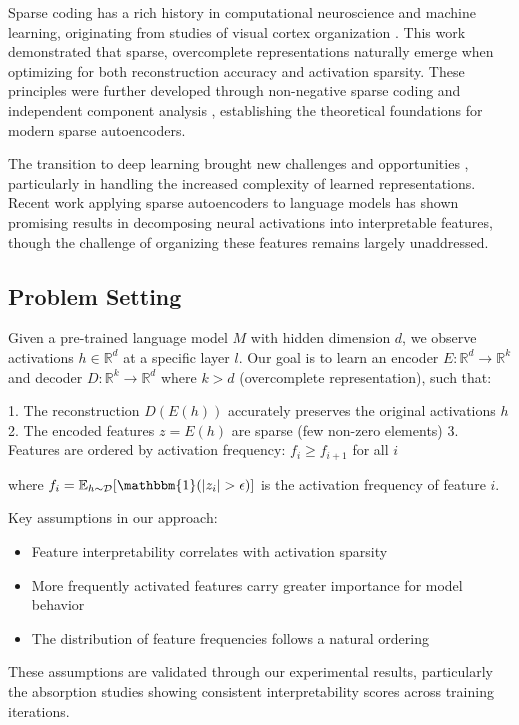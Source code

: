 \documentclass{article} %
\begin{document}
Sparse coding has a rich history in computational neuroscience and machine learning, originating from studies of visual cortex organization \cite{Olshausen1996EmergenceOS}. This work demonstrated that sparse, overcomplete representations naturally emerge when optimizing for both reconstruction accuracy and activation sparsity. These principles were further developed through non-negative sparse coding \cite{Hoyer2002NonnegativeSC} and independent component analysis \cite{Bell1995AnIA}, establishing the theoretical foundations for modern sparse autoencoders.

The transition to deep learning brought new challenges and opportunities \cite{Bengio2007LearningDA}, particularly in handling the increased complexity of learned representations. Recent work applying sparse autoencoders to language models \cite{Cunningham2023SparseAF} has shown promising results in decomposing neural activations into interpretable features, though the challenge of organizing these features remains largely unaddressed.

\subsection{Problem Setting}
Given a pre-trained language model $M$ with hidden dimension $d$, we observe activations $h \in \mathbb{R}^d$ at a specific layer $l$. Our goal is to learn an encoder $E: \mathbb{R}^d \to \mathbb{R}^k$ and decoder $D: \mathbb{R}^k \to \mathbb{R}^d$ where $k > d$ (overcomplete representation), such that:

1. The reconstruction $D(E(h))$ accurately preserves the original activations $h$
2. The encoded features $z = E(h)$ are sparse (few non-zero elements)
3. Features are ordered by activation frequency: $f_i \geq f_{i+1}$ for all $i$

where $f_i = \mathbb{E}_{h \sim \mathcal{D}}[\mathbbm{1}(|z_i| > \epsilon)]$ is the activation frequency of feature $i$.

Key assumptions in our approach:
\begin{itemize}
    \item Feature interpretability correlates with activation sparsity
    \item More frequently activated features carry greater importance for model behavior
    \item The distribution of feature frequencies follows a natural ordering
\end{itemize}

These assumptions are validated through our experimental results, particularly the absorption studies showing consistent interpretability scores across training iterations.
\end{document}
